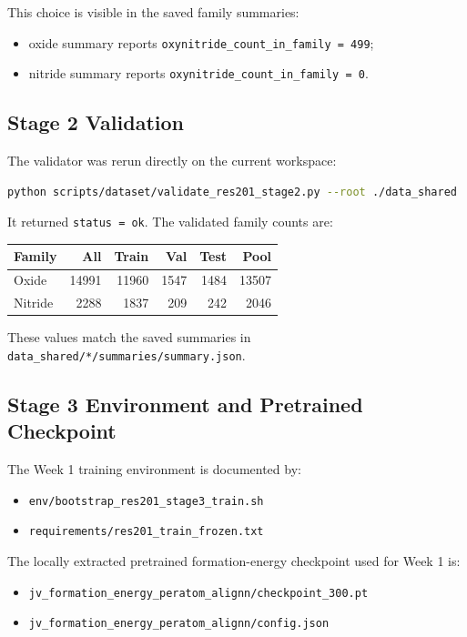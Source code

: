 \documentclass[11pt]{article}
\begin{document}
This choice is visible in the saved family summaries:
\begin{itemize}
  \item oxide summary reports \texttt{oxynitride\_count\_in\_family = 499};
  \item nitride summary reports \texttt{oxynitride\_count\_in\_family = 0}.
\end{itemize}

\subsection{Stage 2 Validation}
The validator was rerun directly on the current workspace:

\begin{lstlisting}[language=bash]
python scripts/dataset/validate_res201_stage2.py --root ./data_shared
\end{lstlisting}

It returned \texttt{status = ok}. The validated family counts are:
\begin{center}
\begin{tabular}{lrrrrr}
\toprule
Family & All & Train & Val & Test & Pool \\
\midrule
Oxide   & 14991 & 11960 & 1547 & 1484 & 13507 \\
Nitride &  2288 &  1837 &  209 &  242 &  2046 \\
\bottomrule
\end{tabular}
\end{center}

These values match the saved summaries in \texttt{data\_shared/*/summaries/summary.json}.

\subsection{Stage 3 Environment and Pretrained Checkpoint}
The Week 1 training environment is documented by:
\begin{itemize}
  \item \texttt{env/bootstrap\_res201\_stage3\_train.sh}
  \item \texttt{requirements/res201\_train\_frozen.txt}
\end{itemize}

The locally extracted pretrained formation-energy checkpoint used for Week 1 is:
\begin{itemize}
  \item \texttt{jv\_formation\_energy\_peratom\_alignn/checkpoint\_300.pt}
  \item \texttt{jv\_formation\_energy\_peratom\_alignn/config.json}
\end{itemize}
\end{document}
